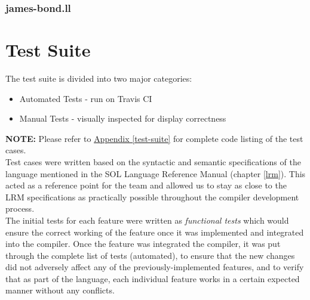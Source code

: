 \documentclass[letterpaper,12pt]{report}
\begin{document}
    \subsubsection{james-bond.ll}
        

  \section{Test Suite}
    The test suite is divided into two major categories:
    \begin{itemize}
      \itemsep 0em
      \item Automated Tests - run on Travis CI
      \item Manual Tests - visually inspected for display correctness
    \end{itemize}

    \textbf{NOTE:} Please refer to \underline{Appendix \ref{test-suite}} for complete code listing of the test cases.\\

    Test cases were written based on the syntactic and semantic specifications of the language mentioned in the SOL Language Reference Manual (chapter \ref{lrm}). This acted as a reference point for the team and allowed us to stay as close to the LRM specifications as practically possible throughout the compiler development process.\\

    The initial tests for each feature were written as \textit{functional tests} which would ensure the correct working of the feature once it was implemented and integrated into the compiler. Once the feature was integrated  the compiler, it was put through the complete list of tests (automated), to ensure that the new changes did not adversely affect any of the previously-implemented features, and to verify that as part of the language, each individual feature works in a certain expected manner without any conflicts.\\
\end{document}
